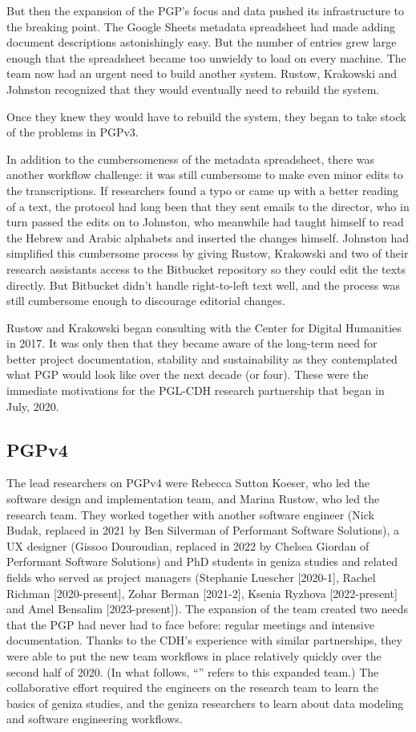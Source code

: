 \documentclass{article}
\begin{document}
But then the expansion of the PGP’s focus and data pushed its infrastructure to the breaking point. The Google Sheets metadata spreadsheet had made adding document descriptions astonishingly easy. But the number of entries grew large enough that the spreadsheet became too unwieldy to load on every machine. The team now had an urgent need to build another system. Rustow, Krakowski and Johnston recognized that they would eventually need to rebuild the system. 

Once they knew they would have to rebuild the system, they began to take stock of the problems in PGPv3. 

In addition to the cumbersomeness of the metadata spreadsheet, there was another workflow challenge: it was still cumbersome to make even minor edits to the transcriptions. If researchers found a typo or came up with a better reading of a text, the protocol had long been that they sent emails to the director, who in turn passed the edits on to Johnston, who meanwhile had taught himself to read the Hebrew and Arabic alphabets and inserted the changes himself. Johnston had simplified this cumbersome process by giving Rustow, Krakowski and two of their research assistants access to the Bitbucket repository so they could edit the texts directly. But Bitbucket didn’t handle right-to-left text well, and the process was still cumbersome enough to discourage editorial changes. 

Rustow and Krakowski began consulting with the Center for Digital Humanities in 2017. It was only then that they became aware of the long-term need for better project documentation, stability and sustainability as they contemplated what PGP would look like over the next decade (or four). These were the immediate motivations for the PGL-CDH research partnership that began in July, 2020.

\subsection{PGPv4}

The lead researchers on PGPv4 were Rebecca Sutton Koeser, who led the software design and implementation team, and Marina Rustow, who led the research team. They worked together with another software engineer (Nick Budak, replaced in 2021 by Ben Silverman of Performant Software Solutions), a UX designer (Gissoo Douroudian, replaced in 2022 by Chelsea Giordan of Performant Software Solutions) and PhD students in geniza studies and related fields who served as project managers (Stephanie Luescher [2020-1], Rachel Richman [2020-present], Zohar Berman [2021-2], Ksenia Ryzhova [2022-present] and Amel Bensalim [2023-present]). The expansion of the team created two needs that the PGP had never had to face before: regular meetings and intensive documentation. Thanks to the CDH’s experience with similar partnerships, they were able to put the new team workflows in place relatively quickly over the second half of 2020. (In what follows, “” refers to this expanded team.) The collaborative effort required the engineers on the research team to learn the basics of geniza studies, and the geniza researchers to learn about data modeling and software engineering workflows.
\end{document}
